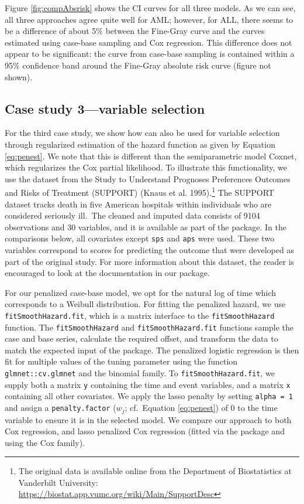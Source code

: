 Figure \ref{fig:compAbsrisk} shows the CI curves for all three models. As we can see, all three approaches agree quite well for AML; however, for ALL, there seems to be a difference of about 5\% between the Fine-Gray curve and the curves estimated using case-base sampling and Cox regression. This difference does not appear to be significant: the curve from case-base sampling is contained within a 95\% confidence band around the Fine-Gray absolute risk curve (figure not shown).

\hypertarget{case-study-3variable-selection}{%
\subsection{Case study 3---variable selection}\label{case-study-3variable-selection}}

For the third case study, we show how  can also be used for variable selection through regularized estimation of the hazard function as given by Equation \eqref{eq:penest}. We note that this is different than the semiparametric model Coxnet, which regularizes the Cox partial likelihood. To illustrate this functionality, we use the dataset from the Study to Understand Prognoses Preferences Outcomes and Risks of Treatment (SUPPORT) (Knaus et al. 1995).\footnote{The original data is available online from the Department of Biostatistics at Vanderbilt University: \url{https://biostat.app.vumc.org/wiki/Main/SupportDesc}} The SUPPORT dataset tracks death in five American hospitals within individuals who are considered seriously ill.~The cleaned and imputed data consists of 9104 observations and 30 variables, and it is available as part of the  package. In the comparisons below, all covariates except \texttt{sps} and \texttt{aps} were used. These two variables correspond to scores for predicting the outcome that were developed as part of the original study. For more information about this dataset, the reader is encouraged to look at the documentation in our package.

For our penalized case-base model, we opt for the natural log of time which corresponds to a Weibull distribution. For fitting the penalized hazard, we use \texttt{fitSmoothHazard.fit}, which is a matrix interface to the \texttt{fitSmoothHazard} function. The \texttt{fitSmoothHazard} and \texttt{fitSmoothHazard.fit} functions sample the case and base series, calculate the required offset, and transform the data to match the expected input of the  package. The penalized logistic regression is then fit for multiple values of the tuning parameter using the function \texttt{glmnet::cv.glmnet} and the binomial family. To \texttt{fitSmoothHazard.fit}, we supply both a matrix \texttt{y} containing the time and event variables, and a matrix \texttt{x} containing all other covariates. We apply the lasso penalty by setting \texttt{alpha\ =\ 1} and assign a \texttt{penalty.factor} (\(w_j\); cf.~Equation \eqref{eq:penest}) of 0 to the time variable to ensure it is in the selected model. We compare our approach to both Cox regression, and lasso penalized Cox regression (fitted via the  package and using the Cox family).

